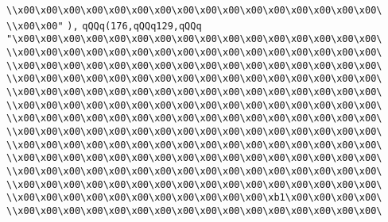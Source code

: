 \verb|\\x00\x00\x00\x00\x00\x00\x00\x00\x00\x00\x00\x00\x00\x00\x00\x00\|\newline
\verb|\\x00\x00"|\newline
\verb|),|\newline
\verb|qQQq(176,qQQq129,qQQq|\newline
\verb|"\x00\x00\x00\x00\x00\x00\x00\x00\x00\x00\x00\x00\x00\x00\x00\x00\|\newline
\verb|\\x00\x00\x00\x00\x00\x00\x00\x00\x00\x00\x00\x00\x00\x00\x00\x00\|\newline
\verb|\\x00\x00\x00\x00\x00\x00\x00\x00\x00\x00\x00\x00\x00\x00\x00\x00\|\newline
\verb|\\x00\x00\x00\x00\x00\x00\x00\x00\x00\x00\x00\x00\x00\x00\x00\x00\|\newline
\verb|\\x00\x00\x00\x00\x00\x00\x00\x00\x00\x00\x00\x00\x00\x00\x00\x00\|\newline
\verb|\\x00\x00\x00\x00\x00\x00\x00\x00\x00\x00\x00\x00\x00\x00\x00\x00\|\newline
\verb|\\x00\x00\x00\x00\x00\x00\x00\x00\x00\x00\x00\x00\x00\x00\x00\x00\|\newline
\verb|\\x00\x00\x00\x00\x00\x00\x00\x00\x00\x00\x00\x00\x00\x00\x00\x00\|\newline
\verb|\\x00\x00\x00\x00\x00\x00\x00\x00\x00\x00\x00\x00\x00\x00\x00\x00\|\newline
\verb|\\x00\x00\x00\x00\x00\x00\x00\x00\x00\x00\x00\x00\x00\x00\x00\x00\|\newline
\verb|\\x00\x00\x00\x00\x00\x00\x00\x00\x00\x00\x00\x00\x00\x00\x00\x00\|\newline
\verb|\\x00\x00\x00\x00\x00\x00\x00\x00\x00\x00\x00\x00\x00\x00\x00\x00\|\newline
\verb|\\x00\x00\x00\x00\x00\x00\x00\x00\x00\x00\x00\xb1\x00\x00\x00\x00\|\newline
\verb|\\x00\x00\x00\x00\x00\x00\x00\x00\x00\x00\x00\x00\x00\x00\x00\x00\|\newline
